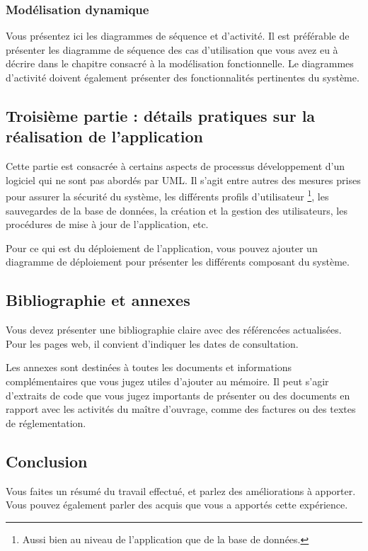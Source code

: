 \documentclass[12pt]{article}
\begin{document}
\subsubsection{Modélisation dynamique}
Vous présentez ici les diagrammes de séquence et d'activité. Il est préférable de présenter les diagramme de séquence des cas d'utilisation que vous avez eu à décrire dans le chapitre consacré à la modélisation fonctionnelle. Le diagrammes d'activité doivent également présenter des fonctionnalités pertinentes du système.

\subsection{Troisième partie : détails pratiques sur la réalisation de l'application}
Cette partie est consacrée à certains aspects de processus développement d'un logiciel qui ne sont pas abordés par UML. Il s'agit entre autres des mesures prises pour assurer la sécurité du système, les différents profils d'utilisateur \footnote{Aussi bien au niveau de l'application que de la base de données.}, les sauvegardes de la base de données, la création et la gestion des utilisateurs, les procédures de mise à jour de l'application, etc. 

Pour ce qui est du déploiement de l'application, vous pouvez ajouter un diagramme de déploiement pour présenter les différents composant du système.

\subsection{Bibliographie et annexes}
Vous devez présenter une bibliographie claire avec des référencées actualisées. Pour les pages web, il convient d'indiquer les dates de consultation.

Les annexes sont destinées à toutes les documents et informations complémentaires que vous jugez utiles d'ajouter au mémoire. Il peut s'agir d'extraits de code que vous jugez importants de présenter ou des documents en rapport avec les activités du maître d'ouvrage, comme des factures ou des textes de réglementation.
\subsection{Conclusion}
Vous faites un résumé du travail effectué, et parlez des améliorations à apporter. Vous pouvez également parler des acquis que vous a apportés cette expérience.
\end{document}
